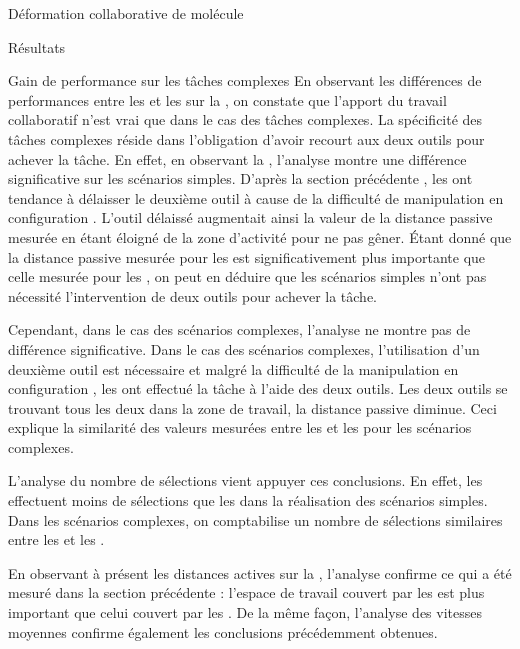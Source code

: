 \documentclass[myfrancais]{mythesis}
\begin{document}
\begin{mychapter}{Déformation collaborative de molécule}
\begin{mysection}{Résultats}
\begin{mysubsection}{Gain de performance sur les tâches complexes}
				En observant les différences de performances entre les  et les  sur la , on constate que l'apport du travail collaboratif n'est vrai que dans le cas des tâches complexes.
				La spécificité des tâches complexes réside dans l'obligation d'avoir recourt aux deux outils pour achever la tâche.
				En effet, en observant la , l'analyse montre une différence significative sur les scénarios simples.
				D'après la section précédente , les  ont tendance à délaisser le deuxième outil à cause de la difficulté de manipulation en configuration .
				L'outil délaissé augmentait ainsi la valeur de la distance passive mesurée en étant éloigné de la zone d'activité pour ne pas gêner.
				Étant donné que la distance passive mesurée pour les  est significativement plus importante que celle mesurée pour les , on peut en déduire que les scénarios simples n'ont pas nécessité l'intervention de deux outils pour achever la tâche.

				Cependant, dans le cas des scénarios complexes, l'analyse ne montre pas de différence significative.
				Dans le cas des scénarios complexes, l'utilisation d'un deuxième outil est nécessaire et malgré la difficulté de la manipulation en configuration , les  ont effectué la tâche à l'aide des deux outils.
				Les deux outils se trouvant tous les deux dans la zone de travail, la distance passive diminue.
				Ceci explique la similarité des valeurs mesurées entre les  et les  pour les scénarios complexes.

				L'analyse du nombre de sélections vient appuyer ces conclusions.
				En effet, les  effectuent moins de sélections que les  dans la réalisation des scénarios simples.
				Dans les scénarios complexes, on comptabilise un nombre de sélections similaires entre les  et les .

				En observant à présent les distances actives sur la , l'analyse confirme ce qui a été mesuré dans la section précédente  : l'espace de travail couvert par les  est plus important que celui couvert par les .
				De la même façon, l'analyse des vitesses moyennes confirme également les conclusions précédemment obtenues.


\end{mysubsection}
\end{mysection}
\end{mychapter}
\end{document}
